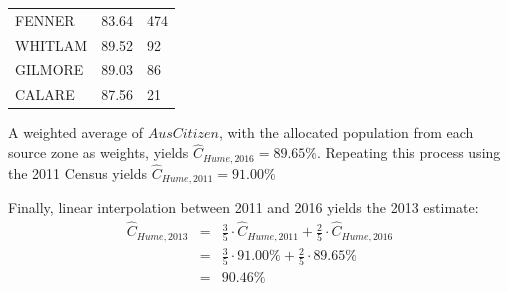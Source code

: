 \documentclass[11pt,a4paper,]{article}
\begin{document}
\begin{longtable}[]{@{}lll@{}}
\begin{minipage}[t]{0.26\columnwidth}\raggedright
FENNER\strut
\end{minipage} & \begin{minipage}[t]{0.19\columnwidth}\raggedright
83.64\strut
\end{minipage} & \begin{minipage}[t]{0.47\columnwidth}\raggedright
474\strut
\end{minipage}\tabularnewline
\begin{minipage}[t]{0.26\columnwidth}\raggedright
WHITLAM\strut
\end{minipage} & \begin{minipage}[t]{0.19\columnwidth}\raggedright
89.52\strut
\end{minipage} & \begin{minipage}[t]{0.47\columnwidth}\raggedright
92\strut
\end{minipage}\tabularnewline
\begin{minipage}[t]{0.26\columnwidth}\raggedright
GILMORE\strut
\end{minipage} & \begin{minipage}[t]{0.19\columnwidth}\raggedright
89.03\strut
\end{minipage} & \begin{minipage}[t]{0.47\columnwidth}\raggedright
86\strut
\end{minipage}\tabularnewline
\begin{minipage}[t]{0.26\columnwidth}\raggedright
CALARE\strut
\end{minipage} & \begin{minipage}[t]{0.19\columnwidth}\raggedright
87.56\strut
\end{minipage} & \begin{minipage}[t]{0.47\columnwidth}\raggedright
21\strut
\end{minipage}\tabularnewline
\bottomrule
\end{longtable}

\normalsize

A weighted average of \(AusCitizen\), with the allocated population from each source zone as weights, yields \(\hat{C}_{Hume,2016} = 89.65 \%\). Repeating this process using the 2011 Census yields \(\hat{C}_{Hume,2011} = 91.00 \%\)

Finally, linear interpolation between 2011 and 2016 yields the 2013 estimate:
\begin{eqnarray*}
\hat{C}_{Hume,2013} & = &\frac{3}{5} \cdot \hat{C}_{Hume,2011} + \frac{2}{5} \cdot \hat{C}_{Hume,2016} \\
& = & \frac{3}{5} \cdot 91.00 \% + \frac{2}{5} \cdot 89.65 \% \\
& = & 90.46 \%
\end{eqnarray*}
\end{document}
